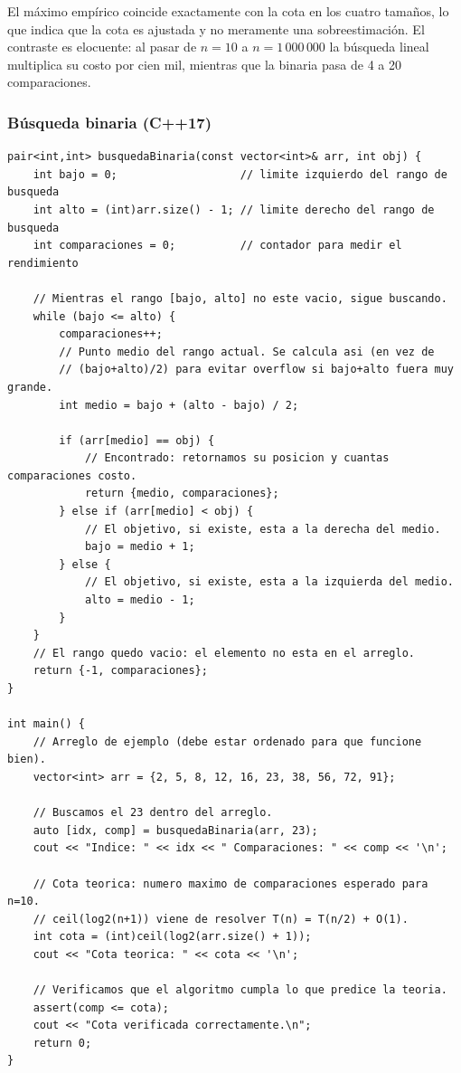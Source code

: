 \documentclass[12pt,a4paper]{article}
\begin{document}
\vspace{6pt}
El máximo empírico coincide exactamente con la cota en los cuatro tamaños, lo que indica
que la cota es ajustada y no meramente una sobreestimación. El contraste es elocuente:
al pasar de $n = 10$ a $n = 1\,000\,000$ la búsqueda lineal multiplica su costo por cien
mil, mientras que la binaria pasa de 4 a 20 comparaciones.

\subsubsection*{Búsqueda binaria (C++17)}

\begin{lstlisting}[style=cpp]
pair<int,int> busquedaBinaria(const vector<int>& arr, int obj) {
    int bajo = 0;                   // limite izquierdo del rango de busqueda
    int alto = (int)arr.size() - 1; // limite derecho del rango de busqueda
    int comparaciones = 0;          // contador para medir el rendimiento

    // Mientras el rango [bajo, alto] no este vacio, sigue buscando.
    while (bajo <= alto) {
        comparaciones++;
        // Punto medio del rango actual. Se calcula asi (en vez de
        // (bajo+alto)/2) para evitar overflow si bajo+alto fuera muy grande.
        int medio = bajo + (alto - bajo) / 2;

        if (arr[medio] == obj) {
            // Encontrado: retornamos su posicion y cuantas comparaciones costo.
            return {medio, comparaciones};
        } else if (arr[medio] < obj) {
            // El objetivo, si existe, esta a la derecha del medio.
            bajo = medio + 1;
        } else {
            // El objetivo, si existe, esta a la izquierda del medio.
            alto = medio - 1;
        }
    }
    // El rango quedo vacio: el elemento no esta en el arreglo.
    return {-1, comparaciones};
}

int main() {
    // Arreglo de ejemplo (debe estar ordenado para que funcione bien).
    vector<int> arr = {2, 5, 8, 12, 16, 23, 38, 56, 72, 91};

    // Buscamos el 23 dentro del arreglo.
    auto [idx, comp] = busquedaBinaria(arr, 23);
    cout << "Indice: " << idx << " Comparaciones: " << comp << '\n';

    // Cota teorica: numero maximo de comparaciones esperado para n=10.
    // ceil(log2(n+1)) viene de resolver T(n) = T(n/2) + O(1).
    int cota = (int)ceil(log2(arr.size() + 1));
    cout << "Cota teorica: " << cota << '\n';

    // Verificamos que el algoritmo cumpla lo que predice la teoria.
    assert(comp <= cota);
    cout << "Cota verificada correctamente.\n";
    return 0;
}
\end{lstlisting}
\end{document}
